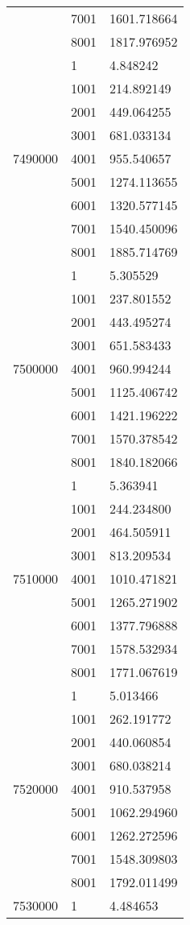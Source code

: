 \begin{table}[htb!]
\begin{tabular}{lll}
 & 7001 & 1601.718664 \\
 & 8001 & 1817.976952 \\
\multirow[c]{9}{*}{7490000} & 1 & 4.848242 \\
 & 1001 & 214.892149 \\
 & 2001 & 449.064255 \\
 & 3001 & 681.033134 \\
 & 4001 & 955.540657 \\
 & 5001 & 1274.113655 \\
 & 6001 & 1320.577145 \\
 & 7001 & 1540.450096 \\
 & 8001 & 1885.714769 \\
\multirow[c]{9}{*}{7500000} & 1 & 5.305529 \\
 & 1001 & 237.801552 \\
 & 2001 & 443.495274 \\
 & 3001 & 651.583433 \\
 & 4001 & 960.994244 \\
 & 5001 & 1125.406742 \\
 & 6001 & 1421.196222 \\
 & 7001 & 1570.378542 \\
 & 8001 & 1840.182066 \\
\multirow[c]{9}{*}{7510000} & 1 & 5.363941 \\
 & 1001 & 244.234800 \\
 & 2001 & 464.505911 \\
 & 3001 & 813.209534 \\
 & 4001 & 1010.471821 \\
 & 5001 & 1265.271902 \\
 & 6001 & 1377.796888 \\
 & 7001 & 1578.532934 \\
 & 8001 & 1771.067619 \\
\multirow[c]{9}{*}{7520000} & 1 & 5.013466 \\
 & 1001 & 262.191772 \\
 & 2001 & 440.060854 \\
 & 3001 & 680.038214 \\
 & 4001 & 910.537958 \\
 & 5001 & 1062.294960 \\
 & 6001 & 1262.272596 \\
 & 7001 & 1548.309803 \\
 & 8001 & 1792.011499 \\
\multirow[c]{9}{*}{7530000} & 1 & 4.484653 \\

\end{tabular}
\end{table}
